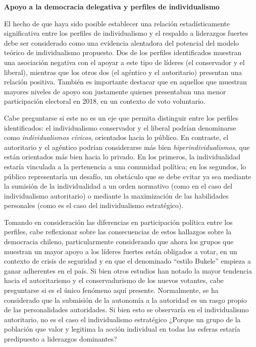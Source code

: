 \documentclass[12pt,twoside]{templates/facsothesis}
\begin{document}
\textbf{Apoyo a la democracia delegativa y perfiles de individualismo}

El hecho de que haya sido posible establecer una relación estadísticamente significativa entre los perfiles de individualismo y el respaldo a liderazgos fuertes debe ser considerado como una evidencia alentadora del potencial del modelo teórico de individualismo propuesto. Dos de los perfiles identificados muestran una asociación negativa con el apoyar a este tipo de líderes (el conservador y el liberal), mientras que los otros dos (el agéntico y el autoritario) presentan una relación positiva. También es importante destacar que en aquellos que muestran mayores niveles de apoyo son justamente quienes presentaban una menor participación electoral en 2018, en un contexto de voto voluntario.

Cabe preguntarse si este no es un eje que permita distinguir entre los perfiles identificados: el individualismo conservador y el liberal podrían denominarse como \emph{individualismos cívicos}, orientados hacia lo público. En contraste, el autoritario y el agéntico podrían considerarse más bien \emph{hiperindividualismos}, que están orientados más bien hacia lo privado. En los primeros, la individualidad estaría vinculada a la pertenencia a una comunidad política; en los segundos, lo público representaría un desafío, un obstáculo que se debe evitar ya sea mediante la sumisión de la individualidad a un orden normativo (como en el caso del individualismo autoritario) o mediante la maximización de las habilidades personales (como es el caso del individualismo estratégico).

Tomando en consideración las diferencias en participación política entre los perfiles, cabe reflexionar sobre las consecuencias de estos hallazgos sobre la democracia chileno, particularmente considerando que ahora los grupos que muestran un mayor apoyo a los líderes fuertes están obligados a votar, en un contexto de crisis de seguridad y en que el denominado ``estilo Bukele'' empieza a ganar adherentes en el país.
Si bien otros estudios \citep{coes2023} han notado la mayor tendencia hacia el autoritarismo y el conservadurismo de los nuevos votantes, cabe preguntarse si es el único fenómeno aquí presente. Normalmente, se ha considerado que la submisión de la autonomía a la autoridad es un rasgo propio de las personalidades autoridades. Si bien esto se observaría en el individualismo autoritario, no es el caso el individualismo estratégico ¿Porque un grupo de la población que valor y legitima la acción individual en todas las esferas estaría predipuesto a liderazgos dominantes?
\end{document}
